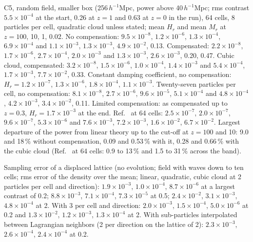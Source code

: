 \documentclass[aps,prd,twocolumn,10pt,superscriptaddress,nofootinbib,longbibliography,floatfix]{revtex4-2}
\begin{document}
C5, random field, smaller box (256\,$h^{-1}$Mpc, power above 40\,$h^{-1}$Mpc; rms contrast $5.5\times10^{-4}$ at the start, 0.26 at $z = 1$ and 0.63 at $z = 0$ in the run), 64 cells, 8 particles per cell, quadratic cloud unless stated; mean $H_r$ and mean $M_r$ at $z = 100$, 10, 1, 0.02. No compensation: $9.5\times10^{-8}$, $1.2\times10^{-6}$, $1.3\times10^{-4}$, $6.9\times10^{-4}$ and $1.1\times10^{-3}$, $1.3\times10^{-3}$, $4.9\times10^{-2}$, 0.13. Compensated: $2.2\times10^{-8}$, $1.7\times10^{-6}$, $2.7\times10^{-4}$, $2.0\times10^{-3}$ and $1.3\times10^{-3}$, $2.6\times10^{-3}$, 0.20, 0.47. Cubic cloud, compensated: $3.2\times10^{-8}$, $1.5\times10^{-6}$, $1.0\times10^{-4}$, $1.4\times10^{-3}$ and $5.4\times10^{-4}$, $1.7\times10^{-3}$, $7.7\times10^{-2}$, 0.33. Constant damping coefficient, no compensation: $H_r = 1.2\times10^{-7}$, $1.3\times10^{-6}$, $1.8\times10^{-4}$, $1.1\times10^{-3}$. Twenty-seven particles per cell, no compensation: $8.1\times10^{-8}$, $2.7\times10^{-6}$, $9.6\times10^{-5}$, $5.1\times10^{-4}$ and $4.8\times10^{-4}$, $4.2\times10^{-3}$, $3.4\times10^{-2}$, 0.11. Limited compensation: as compensated up to $z = 0.3$, $H_r = 1.7\times10^{-3}$ at the end. Ref.~\cite{Daverio:2019gql} at 64 cells: $2.5\times10^{-7}$, $2.0\times10^{-7}$, $9.6\times10^{-7}$, $5.3\times10^{-6}$ and $7.6\times10^{-3}$, $7.2\times10^{-3}$, $1.6\times10^{-2}$, $6.7\times10^{-2}$. Largest departure of the power from linear theory up to the cut-off at $z = 100$ and 10: 9.0 and 18\,\% without compensation, 0.09 and 0.53\,\% with it, 0.28 and 0.66\,\% with the cubic cloud (Ref.~\cite{Daverio:2019gql} at 64 cells: 0.9 to 13\,\% and 1.5 to 31\,\% across the band).

Sampling error of a displaced lattice (no evolution; field with waves down to ten cells; rms error of the density over the mean; linear, quadratic, cubic cloud at 2 particles per cell and direction): $1.9\times10^{-3}$, $1.0\times10^{-4}$, $8.7\times10^{-6}$ at a largest contrast of 0.2; $8.8\times10^{-3}$, $7.1\times10^{-4}$, $7.3\times10^{-5}$ at 0.5; $2.4\times10^{-2}$, $3.1\times10^{-3}$, $4.8\times10^{-4}$ at 2. With 3 per cell and direction: $2.0\times10^{-3}$, $1.5\times10^{-4}$, $5.0\times10^{-6}$ at 0.2 and $1.3\times10^{-2}$, $1.2\times10^{-3}$, $1.3\times10^{-4}$ at 2. With sub-particles interpolated between Lagrangian neighbors (2 per direction on the lattice of 2): $2.3\times10^{-3}$, $2.6\times10^{-4}$, $2.4\times10^{-4}$ at 0.2.
\end{document}
